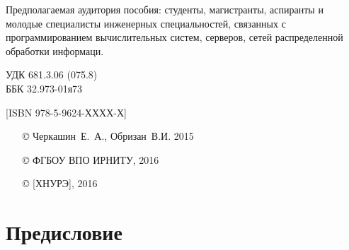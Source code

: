 \documentclass[14pt, a4paper, openany, twoside, draft]{extbook} %
\newcommand{\e}[2][fcolor]{\textcolor{pcolor}{[}\textcolor{#1}{#2}\textcolor{pcolor}{]}}
\begin{document}
\begin{mygroup}
\begin{minipage}[t]{0.95\linewidth}
Предполагаемая аудитория пособия: студенты, магистранты, аспиранты и молодые специалисты инженерных специальностей, связанных с программированием вычислительных систем, серверов, сетей распределенной обработки информаци.

\mbox{}
\endgroup
\end{minipage}
\mbox{}\hspace{0.7\linewidth}
\begin{minipage}{0.3\linewidth}\small
\noindent УДК 681.3.06 (075.8)\\
\noindent ББК 32.973-01я73
\end{minipage}

\vfill
\noindent\begin{minipage}[t]{0.35\linewidth}\small
\noindent \e{ISBN 978-5-9624-ХХХХ-Х}
\end{minipage}%
\begin{minipage}[t]{0.65\linewidth}\small
\begin{itemize}
\setlength{\itemsep}{-0.5ex}
\setlength{\parsep}{0pt}
\item[\copyright{}] Черкашин~Е.~А., Обризан~В.И. 2015
\item[\copyright{}] ФГБОУ ВПО ИРНИТУ, 2016
\item[\copyright{}] \e{ХНУРЭ}, 2016
\end{itemize}
\end{minipage}
\end{mygroup}
\clearpage
\tableofcontents
\clearpage

\newpage
\chapter*{Предисловие}

\end{document}
